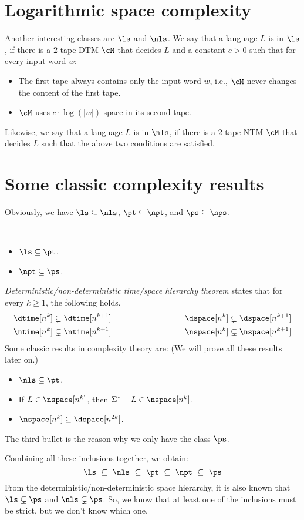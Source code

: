 \documentclass[11pt, a4paper]{article}
\begin{document}
\section{Logarithmic space complexity}

Another interesting classes are $\ls$ and $\nls$.
We say that a language $L$ is in $\ls$, if
there is a $2$-tape DTM $\cM$ that decides $L$ and a constant $c>0$ such that
for every input word $w$:
\begin{itemize}\itemsep=0pt
\item
The first tape always contains only the input word $w$, i.e.,
$\cM$ \underline{never} changes the content of the first tape.
\item
$\cM$ uses $ c\cdot \log(|w|)$ space in its second tape.
\end{itemize}
Likewise, we say that a language $L$ is in $\nls$, if
there is a $2$-tape NTM $\cM$ that decides $L$ such that
the above two conditions are satisfied.

\section{Some classic complexity results}

Obviously, we have 
$\ls \subseteq \nls$,
$\pt \subseteq \npt$, and
$\ps \subseteq \nps$.

\begin{proposition}~
\begin{itemize}\itemsep=0pt
\item
$\ls \subseteq \pt$.
\item
$\npt \subseteq \ps$.
\end{itemize}
\end{proposition}

{\em Deterministic/non-deterministic time/space hierarchy theorem} states that
for every $k\geq 1$, the following holds.
\begin{eqnarray*}
\dtime [n^k]  \subsetneq  \dtime [n^{k+1}]
& \qquad\qquad\qquad\qquad &
\dspace [n^k]  \subsetneq  \dspace [n^{k+1}]
\\
\ntime [n^k]  \subsetneq  \ntime [n^{k+1}]
& \qquad\qquad &
\nspace [n^k]  \subsetneq  \nspace [n^{k+1}]
\end{eqnarray*}
Some classic results in complexity theory are:
(We will prove all these results later on.)
\begin{itemize}\itemsep=0pt
\item
$\nls \subseteq \pt$.
\item
If $L \in \nspace[n^k]$, then $\Sigma^{\ast}-L \in \nspace[n^k]$.
\item
$\nspace[n^k] \subseteq \dspace[n^{2k}]$.
\end{itemize}
The third bullet is the reason why we only have the class $\ps$.


Combining all these inclusions together,
we obtain:
$$
\ls \ \subseteq \
\nls \ \subseteq \
\pt \ \subseteq \
\npt \ \subseteq \
\ps
$$
From the deterministic/non-deterministic space hierarchy, 
it is also known that $\ls \subsetneq \ps$ and $\nls \subsetneq \ps$.
So, we know that at least one of the inclusions must be strict,
but we don't know which one.



 
\end{document}
